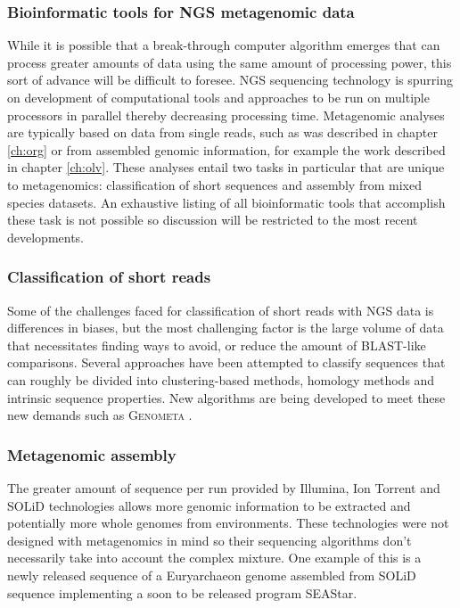 \subsubsection{Bioinformatic tools for \acs{NGS} metagenomic data}
While it is possible that a break-through computer algorithm emerges that can process greater amounts of data using the same amount of processing power, this sort of advance will be difficult to foresee.
\ac{NGS} sequencing technology is spurring on development of computational tools and approaches to be run on multiple processors in parallel thereby decreasing processing time.
Metagenomic analyses are typically based on data from single reads, such as was described in chapter \ref{ch:org} or from assembled genomic information, for example the work described in chapter \ref{ch:olv}.
These analyses entail two tasks in particular that are unique to metagenomics: classification of short sequences and assembly from mixed species datasets. 
An exhaustive listing of all bioinformatic tools that accomplish these task is not possible so discussion will be restricted to the most recent developments.
\subsubsection{Classification of short reads}
Some of the challenges faced for classification of short reads with \ac{NGS} data is differences in biases, but the most challenging factor is the large volume of data that necessitates finding ways to avoid, or reduce the amount of BLAST-like comparisons.
Several approaches have been attempted to classify sequences that can roughly be divided into clustering-based methods, homology methods and intrinsic sequence properties.
New algorithms are being developed to meet these new demands such as \textsc{Genometa} \cite{Davenport2012}.

\subsubsection{Metagenomic assembly}
The greater amount of sequence per run provided by Illumina, Ion Torrent and SOLiD technologies allows more genomic information to be extracted and potentially more whole genomes from environments.
These technologies were not designed with metagenomics in mind so their sequencing algorithms don't necessarily take into account the complex mixture.
One example of this is a newly released sequence of a Euryarchaeon genome assembled from SOLiD sequence implementing a soon to be released program SEAStar.

